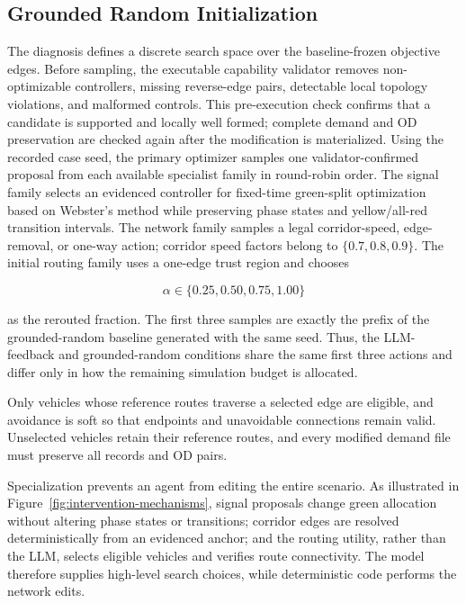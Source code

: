 \documentclass{trbunofficial}
\begin{document}
\subsection{Grounded Random Initialization}
\label{sec:grounded-proposals}

The diagnosis defines a discrete search space over the baseline-frozen
objective edges.  Before sampling, the executable capability validator removes
non-optimizable controllers, missing reverse-edge pairs, detectable local
topology violations, and malformed controls.  This pre-execution check confirms
that a candidate is supported and locally well formed; complete demand and OD
preservation are checked again after the modification is materialized.  Using
the recorded case seed, the primary optimizer samples one validator-confirmed
proposal from each available specialist family in round-robin order.  The
signal family selects an evidenced controller for fixed-time green-split
optimization based on Webster's method while preserving phase states and
yellow/all-red transition intervals.  The
network family samples a legal corridor-speed, edge-removal, or one-way action;
corridor speed factors belong to $\{0.7,0.8,0.9\}$.  The initial routing family
uses a one-edge trust region and chooses

\begin{equation}
    \alpha\in\{0.25,0.50,0.75,1.00\}
\end{equation}

as the rerouted fraction.  The first three samples are exactly the prefix of
the grounded-random baseline generated with the same seed.  Thus, the
LLM-feedback and grounded-random conditions share the same first three actions
and differ only in how the remaining simulation budget is allocated.

Only vehicles whose
reference routes traverse a selected edge are eligible, and avoidance is soft
so that endpoints and unavoidable connections remain valid.  Unselected
vehicles retain their reference routes, and every modified demand file must
preserve all records and OD pairs.

Specialization prevents an agent from editing the entire scenario.  As
illustrated in Figure~\ref{fig:intervention-mechanisms}, signal proposals change
green allocation without altering phase states or transitions; corridor edges
are resolved deterministically from an evidenced anchor; and the routing
utility, rather than the LLM, selects eligible vehicles and verifies route
connectivity.  The model therefore supplies high-level search choices, while
deterministic code performs the network edits.
\end{document}
